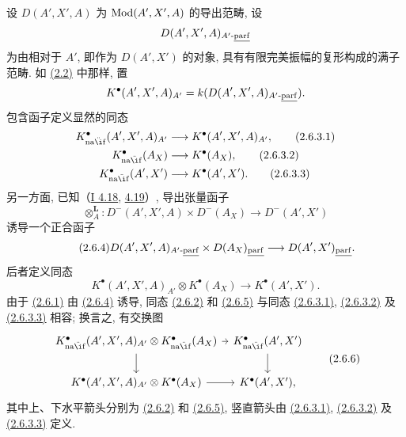 设 \(D(A',X',A)\) 为 \(\operatorname{Mod}(A',X',A)\) 的导出范畴, 设
\[
 D(A',X',A)_{A'\text{-}\underline{\operatorname{parf}}}
\]
为由相对于 \(A'\), 即作为 \(D(A',X')\) 的对象, 具有有限完美振幅的复形构成的满子范畴. 如 \hyperlink{sga6.e04.def.2-2}{(2.2)} 中那样, 置
\[
 K^{\bullet}(A',X',A)_{A'}=k(D(A',X',A)_{A'\text{-}\underline{\operatorname{parf}}}).
\]
包含函子定义显然的同态
\begin{align}
 K^{\bullet}_{\naif}(A',X',A)_{A'}&\longrightarrow K^{\bullet}(A',X',A)_{A'}, \tag{2.6.3.1}\\
 K^{\bullet}_{\naif}(A_X)&\longrightarrow K^{\bullet}(A_X), \tag{2.6.3.2}\\
 K^{\bullet}_{\naif}(A',X')&\longrightarrow K^{\bullet}(A',X'). \tag{2.6.3.3}
\end{align}
另一方面, 已知（\hyperlink{sga6.e01.prop.4-18}{I 4.18}, \hyperlink{sga6.e01.cor.4-19}{4.19}）, 导出张量函子
\[
 \otimes_A^{\mathbf L}:D^-(A',X',A)\times D^-(A_X)\longrightarrow D^-(A',X')
\]
诱导一个正合函子
\begin{equation}\tag{2.6.4}
 D(A',X',A)_{A'\text{-}\underline{\operatorname{parf}}}\times D(A_X)_{\underline{\operatorname{parf}}}
 \longrightarrow D(A',X')_{\underline{\operatorname{parf}}}.
\end{equation}
后者定义同态
\begin{equation}\tag{2.6.5}
 K^{\bullet}(A',X',A)_{A'}\otimes K^{\bullet}(A_X)\longrightarrow K^{\bullet}(A',X').
\end{equation}
由于 \hyperlink{sga6.e04.eq.2-6-1}{(2.6.1)} 由 \hyperlink{sga6.e04.eq.2-6-4}{(2.6.4)} 诱导, 同态 \hyperlink{sga6.e04.eq.2-6-2}{(2.6.2)} 和 \hyperlink{sga6.e04.eq.2-6-5}{(2.6.5)} 与同态 \hyperlink{sga6.e04.eq.2-6-3-1}{(2.6.3.1)}, \hyperlink{sga6.e04.eq.2-6-3-2}{(2.6.3.2)} 及 \hyperlink{sga6.e04.eq.2-6-3-3}{(2.6.3.3)} 相容; 换言之, 有交换图
\[
\begin{tikzcd}[column sep=tiny]
K^{\bullet}_{\naif}(A',X',A)_{A'}\otimes K^{\bullet}_{\naif}(A_X)\arrow[r]\arrow[d]
&K^{\bullet}_{\naif}(A',X')\arrow[d]\\
K^{\bullet}(A',X',A)_{A'}\otimes K^{\bullet}(A_X)\arrow[r]
&K^{\bullet}(A',X'),
\end{tikzcd}
\tag{2.6.6}
\]
其中上、下水平箭头分别为 \hyperlink{sga6.e04.eq.2-6-2}{(2.6.2)} 和 \hyperlink{sga6.e04.eq.2-6-5}{(2.6.5)}, 竖直箭头由 \hyperlink{sga6.e04.eq.2-6-3-1}{(2.6.3.1)}, \hyperlink{sga6.e04.eq.2-6-3-2}{(2.6.3.2)} 及 \hyperlink{sga6.e04.eq.2-6-3-3}{(2.6.3.3)} 定义.

